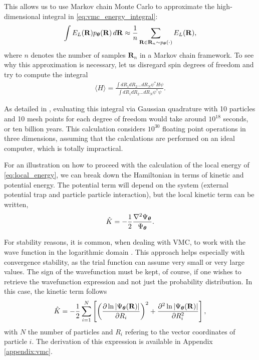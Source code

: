 This allows us to use Markov chain Monte Carlo to approximate the high-dimensional integral in \eqref{eq:vmc_energy_integral}:
\begin{equation}
\int E_L(\mathbf{R}) p_{\boldsymbol{\theta}}(\mathbf{R}) \, d\mathbf{R} \approx \frac{1}{n} \sum_{\mathbf{R} \in \mathbf{R}_n \sim p_{\boldsymbol{\theta}}(\cdot)} E_L(\mathbf{R}), 
\label{eq:mc_integration2}
\end{equation}
where $n$ denotes the number of samples $\mathbf{R}_n$ in a Markov chain framework. To see why this approximation is necessary, let us disregard spin degrees of freedom and try to compute the integral
\begin{align*}
    \langle H \rangle = \frac{\int dR_1 dR_2 \ldots dR_N \psi^* H \psi }{\int dR_1 dR_2 \ldots dR_N \psi^* \psi}.
\end{align*}

As detailed in \cite{hjorth-jensen2021}, evaluating this integral via Gaussian quadrature with 10 particles and 10 mesh points for each degree of freedom would take around $10^{18}$ seconds, or ten billion years. This calculation considers $10^{30}$ floating point operations in three dimensions, assuming that the calculations are performed on an ideal computer, which is totally impractical.

For an illustration on how to proceed with the calculation of the local energy of \eqref{eq:local_energy}, we can break down the Hamiltonian in terms of kinetic and potential energy. The potential term will depend on the system (external potential trap and particle particle interaction), but the local kinetic term can be written,
\begin{align*}
    \hat{K} = -\frac{1}{2}\frac{\mathbf{\nabla}^{2} \Psi_{\boldsymbol{\theta}}}{\Psi_{\boldsymbol{\theta}}}.
\end{align*}

For stability reasons, it is common, when dealing with VMC, to work with the wave function in the logarithmic domain \cite{sorellabook}. This approach helps especially with convergence stability, as the trial function can assume very small or very large values. The sign of the wavefunction must be kept, of course, if one wishes to retrieve the wavefunction expression and not just the probability distribution. In this case, the kinetic term follows
\begin{equation*}
    \hat{K} = -\frac{1}{2} \sum_{i=1}^N \left[ \left(\frac{\partial \ln\left|\Psi_{\boldsymbol{\theta}}(\mathbf{R})\right|}{\partial R_i}\right)^2 + \frac{\partial^2 \ln\left|\Psi_{\boldsymbol{\theta}}(\mathbf{R})\right|}{\partial R_i^2} \right],
\end{equation*} 
with $N$ the number of particles and $R_i$ refering to the vector coordinates of particle $i$. The derivation of this expression is available in Appendix \ref{appendix:vmc}.

